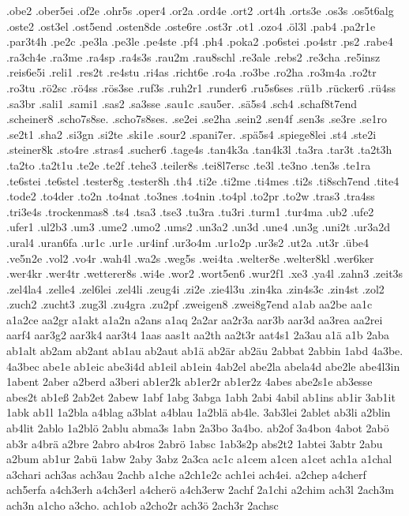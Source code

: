 {.obe2
.ober5ei
.of2e
.ohr5s
.oper4
.or2a
.ord4e
.ort2
.ort4h
.orts3e
.os3s
.os5t6alg
.oste2
.ost3el
.ost5end
.osten8de
.oste6re
.ost3r
.ot1
.ozo4
.öl3l
.pab4
.pa2r1e
.par3t4h
.pe2c
.pe3la
.pe3le
.pe4ste
.pf4
.ph4
.poka2
.po6stei
.po4str
.ps2
.rabe4
.ra3ch4e
.ra3me
.ra4sp
.ra4s3s
.rau2m
.rau8schl
.re3ale
.rebs2
.re3cha
.re5insz
.reis6e5i
.reli1
.res2t
.re4stu
.ri4as
.richt6e
.ro4a
.ro3be
.ro2ha
.ro3m4a
.ro2tr
.ro3tu
.rö2sc
.rö4ss
.rös3se
.ruf3s
.ruh2r1
.runder6
.ru5s6ses
.rü1b
.rücker6
.rü4ss
.sa3br
.sali1
.sami1
.sas2
.sa3sse
.sau1c
.sau5er.
.sä5s4
.sch4
.schaf8t7end
.scheiner8
.scho7s8se.
.scho7s8ses.
.se2ei
.se2ha
.sein2
.sen4f
.sen3s
.se3re
.se1ro
.se2t1
.sha2
.si3gn
.si2te
.ski1e
.sour2
.spani7er.
.spä5s4
.spiege8lei
.st4
.ste2i
.steiner8k
.sto4re
.stras4
.sucher6
.tage4s
.tan4k3a
.tan4k3l
.ta3ra
.tar3t
.ta2t3h
.ta2to
.ta2t1u
.te2e
.te2f
.tehe3
.teiler8s
.tei8l7ersc
.te3l
.te3no
.ten3s
.te1ra
.te6stei
.te6stel
.tester8g
.tester8h
.th4
.ti2e
.ti2me
.ti4mes
.ti2s
.ti8sch7end
.tite4
.tode2
.to4der
.to2n
.to4nat
.to3nes
.to4nin
.to4pl
.to2pr
.to2w
.tras3
.tra4ss
.tri3e4s
.trockenmas8
.ts4
.tsa3
.tse3
.tu3ra
.tu3ri
.turm1
.tur4ma
.ub2
.ufe2
.ufer1
.ul2b3
.um3
.ume2
.umo2
.ums2
.un3a2
.un3d
.une4
.un3g
.uni2t
.ur3a2d
.ural4
.uran6fa
.ur1c
.ur1e
.ur4inf
.ur3o4m
.ur1o2p
.ur3s2
.ut2a
.ut3r
.übe4
.ve5n2e
.vol2
.vo4r
.wah4l
.wa2s
.weg5s
.wei4ta
.welter8e
.welter8kl
.wer6ker
.wer4kr
.wer4tr
.wetterer8s
.wi4e
.wor2
.wort5en6
.wur2f1
.xe3
.ya4l
.zahn3
.zeit3s
.zel4la4
.zelle4
.zel6lei
.zel4li
.zeug4i
.zi2e
.zie4l3u
.zin4ka
.zin4s3c
.zin4st
.zol2
.zuch2
.zucht3
.zug3l
.zu4gra
.zu2pf
.zweigen8
.zwei8g7end
a1ab
aa2be
aa1c
a1a2ce
aa2gr
a1akt
a1a2n
a2ans
a1aq
2a2ar
aa2r3a
aar3b
aar3d
aa3rea
aa2rei
aarf4
aar3g2
aar3k4
aar3t4
1aas
aas1t
aa2th
aa2t3r
aat4s1
2a3au
a1ä
a1b
2aba
ab1alt
ab2am
ab2ant
ab1au
ab2aut
ab1ä
ab2är
ab2äu
2abbat
2abbin
1abd
4a3be.
4a3bec
abe1e
ab1eic
abe3i4d
ab1eil
ab1ein
4ab2el
abe2la
abela4d
abe2le
abe4l3in
1abent
2aber
a2berd
a3beri
ab1er2k
ab1er2r
ab1er2z
4abes
abe2s1e
ab3esse
abes2t
ab1eß
2ab2et
2abew
1abf
1abg
3abga
1abh
2abi
4abil
ab1ins
ab1ir
3ab1it
1abk
ab1l
1a2bla
a4blag
a3blat
a4blau
1a2blä
ab4le.
3ab3lei
2ablet
ab3li
a2blin
ab4lit
2ablo
1a2blö
2ablu
abma3s
1abn
2a3bo
3a4bo.
ab2of
3a4bon
4abot
2abö
ab3r
a4brä
a2bre
2abro
ab4ros
2abrö
1absc
1ab3s2p
abs2t2
1abtei
3abtr
2abu
a2bum
ab1ur
2abü
1abw
2aby
3abz
2a3ca
ac1c
a1cem
a1cen
a1cet
ach1a
a1chal
a3chari
ach3as
ach3au
2achb
a1che
a2ch1e2c
ach1ei
ach4ei.
a2chep
a4cherf
ach5erfa
a4ch3erh
a4ch3erl
a4cherö
a4ch3erw
2achf
2a1chi
a2chim
ach3l
2ach3m
ach3n
a1cho
a3cho.
ach1ob
a2cho2r
ach3ö
2ach3r
2achsc
}
